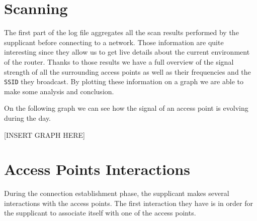
\section{Scanning}
The first part of the log file aggregates all the scan results performed by the supplicant before connecting to a network. Those information are quite interesting since they allow us to get live details about the current environment of the router. Thanks to those results we have a full overview of the signal strength of all the surrounding access points as well as their frequencies and the \texttt{SSID} they broadcast. By plotting these information on a graph we are able to make some analysis and conclusion.

On the following graph we can see how the signal of an access point is evolving during the day. 

[INSERT GRAPH HERE]



\section{Access Points Interactions}
During the connection establishment phase, the supplicant makes several interactions with the access points. The first interaction they have is in order for the supplicant to associate itself with one of the access points. 





